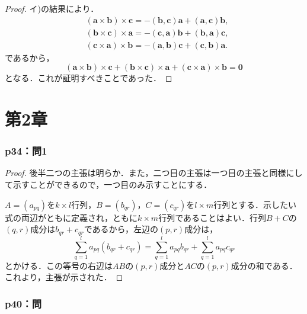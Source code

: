 \documentclass[a4paper,10pt,fleqn]{ltjsarticle}
\begin{document}
\begin{tleftbar}
  \begin{proof}
    イ)の結果により．
    \begin{align*}
       & (\bm{a}\times\bm{b}) \times \bm{c} =  -(\bm{b},\bm{c})\bm{a}+(\bm{a},\bm{c}) \bm{b} ,    \\
       & (\bm{b} \times \bm{c} ) \times \bm{a} = -(\bm{c},\bm{a}) \bm{b} +(\bm{b},\bm{a}) \bm{c}, \\
       & (\bm{c} \times \bm{a} ) \times \bm{b} = -(\bm{a},\bm{b}) \bm{c} +(\bm{c},\bm{b}) \bm{a}.
    \end{align*}
    であるから，
    \[
      (\bm{a}\times\bm{b}) \times \bm{c} + (\bm{b} \times \bm{c} ) \times \bm{a}+(\bm{c} \times \bm{a} ) \times \bm{b} =\bm{0}
    \]
    となる．これが証明すべきことであった．
  \end{proof}
\end{tleftbar}


\part*{第2章}


\section*{p34：問1}

\begin{tleftbar}
  \begin{proof}
    後半二つの主張は明らか．また，二つ目の主張は一つ目の主張と同様にして示すことができるので，一つ目のみ示すことにする．


    $A=(a_{pq})$を$k \times l$行列，$B= (b_{qr})$，$C=(c_{qr})$を$l \times m$行列とする．示したい式の両辺がともに定義され，ともに$k \times m$行列であることはよい．行列$B+C$の$(q,r)$成分は$b_{qr}+c_{qr}$であるから，左辺の$(p,r)$成分は，
    \[
      \sum_{q=1}^{l}a_{pq}\left(b_{qr}+c_{qr}\right)=\sum_{q=1}^{l}a_{pq}b_{qr}+\sum_{q=1}^{l}a_{pq}c_{qr}
    \]
    とかける．この等号の右辺は$AB$の$(p,r)$成分と$AC$の$(p,r)$成分の和である．これより，主張が示された．
  \end{proof}
\end{tleftbar}



\section*{p40：問}
\end{document}
